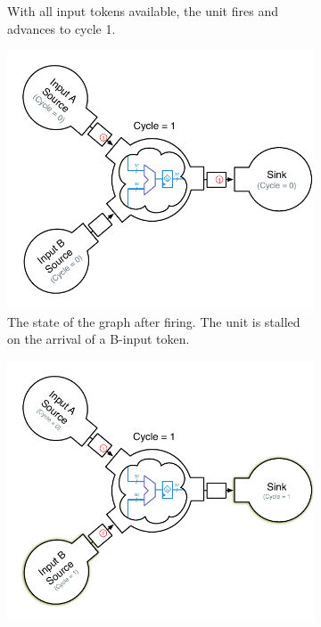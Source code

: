 \begin{figure}
\begin{subfigure}[t]{0.49\textwidth}
        \caption{With all input tokens available, the unit fires and advances to cycle 1.}
    \end{subfigure}
    \begin{subfigure}[t]{0.49\textwidth}
        \captionsetup{margin=0.25cm}
        \includegraphics[width=\columnwidth]{figures/adder-example3.pdf}
        \caption{The state of the graph after firing. The unit is stalled on the arrival of a B-input token.}
    \end{subfigure}
    \begin{subfigure}[t]{0.49\textwidth}
        \captionsetup{margin=0.25cm}
        \includegraphics[width=\columnwidth]{figures/adder-example4.pdf}

\end{subfigure}
\end{figure}
